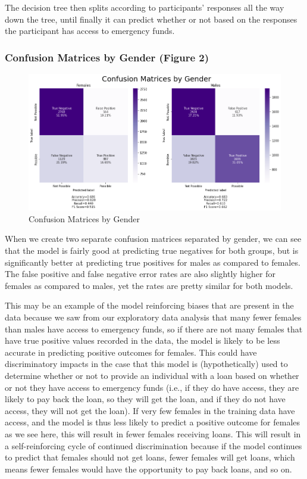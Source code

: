 \documentclass[water,article,submit,moreauthors,pdftex]{mdpi}
\begin{document}
The decision tree then splits according to participants' responses all
the way down the tree, until finally it can predict whether or not based
on the responses the participant has access to emergency funds.

\hypertarget{confusion-matrices-by-gender-figure-2}{%
\subsubsection{Confusion Matrices by Gender (Figure
2)}\label{confusion-matrices-by-gender-figure-2}}

\begin{figure}
\centering
\includegraphics[width=\textwidth,height=0.5\textheight]{images/confusionMatrices.png}
\caption{Confusion Matrices by Gender}
\end{figure}

When we create two separate confusion matrices separated by gender, we
can see that the model is fairly good at predicting true negatives for
both groups, but is significantly better at predicting true positives
for males as compared to females. The false positive and false negative
error rates are also slightly higher for females as compared to males,
yet the rates are pretty similar for both models.

This may be an example of the model reinforcing biases that are present
in the data because we saw from our exploratory data analysis that many
fewer females than males have access to emergency funds, so if there are
not many females that have true positive values recorded in the data,
the model is likely to be less accurate in predicting positive outcomes
for females. This could have discriminatory impacts in the case that
this model is (hypothetically) used to determine whether or not to
provide an individual with a loan based on whether or not they have
access to emergency funds (i.e., if they do have access, they are likely
to pay back the loan, so they will get the loan, and if they do not have
access, they will not get the loan). If very few females in the training
data have access, and the model is thus less likely to predict a
positive outcome for females as we see here, this will result in fewer
females receiving loans. This will result in a self-reinforcing cycle of
continued discrimination because if the model continues to predict that
females should not get loans, fewer females will get loans, which means
fewer females would have the opportunity to pay back loans, and so on.
\end{document}
